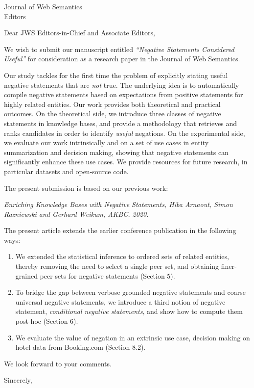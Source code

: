 \documentclass{letter}
\begin{document}
\begin{letter}{Journal of Web Semantics \\ Editors}
\opening{Dear JWS Editors-in-Chief and Associate Editors,}

We wish to submit our manuscript entitled \textit{``Negative Statements Considered Useful''} for consideration as a research paper in the Journal of Web Semantics.

Our study tackles for the first time the problem of explicitly stating useful negative statements that are \textit{not} true. The underlying idea is to automatically compile negative statements based on expectations from positive statements for highly related entities. Our work provides both theoretical and practical outcomes. On the theoretical side, we introduce three classes of negative statements in knowledge bases, and provide a methodology that retrieves and ranks candidates in order to identify \textit{useful} negations. On the experimental side, we evaluate our work intrinsically and on a set of use cases in entity summarization and decision making, showing that negative statements can significantly enhance these use cases. We provide resources for future research, in particular datasets and open-source code.

The present submission is based on our previous work:

\textit{Enriching Knowledge Bases with Negative Statements, Hiba Arnaout, Simon Raz\-niew\-ski and Gerhard Weikum, AKBC, 2020.}

The present article extends the earlier conference publication in the following ways:
\begin{enumerate}
    \item We extended the statistical inference to ordered sets of related entities, thereby removing the need to select a single peer set, and obtaining finer-grained peer sets for negative statements (Section 5).
    \item To bridge the gap between verbose grounded negative statements and coarse universal negative statements, we introduce a third notion of negative statement, \emph{conditional negative statements}, and show how to compute them post-hoc (Section 6).
    \item We evaluate the value of negation in an extrinsic use case, decision making on hotel data from Booking.com (Section 8.2).
\end{enumerate}

We look forward to your comments.

\closing{Sincerely,
}

%

\end{letter}
\end{document}
